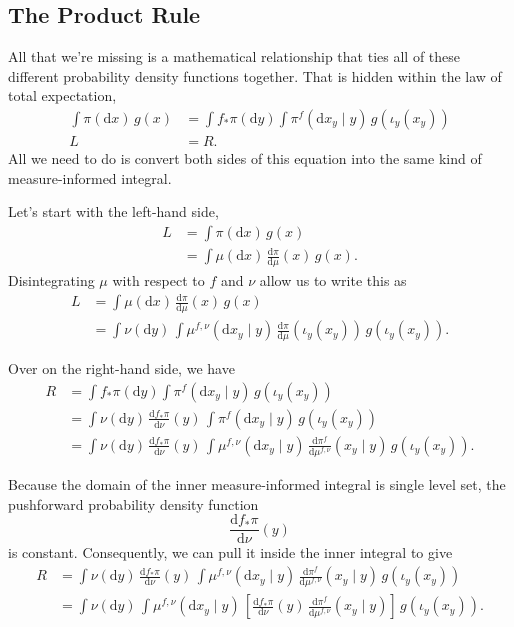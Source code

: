 \documentclass[
  letterpaper,
  DIV=11,
  numbers=noendperiod]{scrartcl}
\begin{document}
\subsection{The Product Rule}\label{the-product-rule}

All that we're missing is a mathematical relationship that ties all of
these different probability density functions together. That is hidden
within the law of total expectation, \begin{align*}
\int \pi( \mathrm{d} x ) \, g(x)
&=
\int f_{*} \pi (\mathrm{d} y)
\int \pi^{f}( \mathrm{d}x_y \mid y ) \, g( \iota_{y}(x_{y}) )
\\
L
&=
R.
\end{align*} All we need to do is convert both sides of this equation
into the same kind of measure-informed integral.

Let's start with the left-hand side, \begin{align*}
L
&=
\int \pi ( \mathrm{d} x ) \, g(x)
\\
&=
\int \mu ( \mathrm{d} x ) \, \frac{ \mathrm{d} \pi}{ \mathrm{d} \mu }(x) \, g(x).
\end{align*} Disintegrating \(\mu\) with respect to \(f\) and \(\nu\)
allow us to write this as \begin{align*}
L
&=
\int \mu ( \mathrm{d} x ) \, \frac{ \mathrm{d} \pi}{ \mathrm{d} \mu }(x) \, g(x)
\\
&=
\int \nu ( \mathrm{d} y ) \,
\int \mu^{f, \nu}( \mathrm{d} x_{y} \mid y) \,
\frac{ \mathrm{d} \pi}{ \mathrm{d} \mu }( \iota_{y}(x_{y}) ) \, g( \iota_{y}(x_{y}) ).
\end{align*}

Over on the right-hand side, we have \begin{align*}
R
&=
\int f_{*} \pi (\mathrm{d} y)
\int \pi^{f}( \mathrm{d}x_{y} \mid y ) \,
g( \iota_{y}(x_{y}) )
\\
&=
\int \nu (\mathrm{d} y) \,
\frac{ \mathrm{d}  f_{*} \pi }{ \mathrm{d}  \nu  }(y) \,
\int \pi^{f}( \mathrm{d}x_{y} \mid y ) \,
g( \iota_{y}(x_{y}) )
\\
&=
\int \nu (\mathrm{d} y) \,
\frac{ \mathrm{d}  f_{*} \pi }{ \mathrm{d}  \nu  }(y) \,
\int \mu^{f, \nu} ( \mathrm{d}x_{y} \mid y ) \,
\frac{ \mathrm{d}  \pi^{f} }{ \mathrm{d}  \mu^{f, \nu}  }(x_{y} \mid y) \,
g( \iota_{y}(x_{y}) ).
\end{align*}

Because the domain of the inner measure-informed integral is single
level set, the pushforward probability density function \[
\frac{ \mathrm{d}  f_{*} \pi }{ \mathrm{d}  \nu  }(y)
\] is constant. Consequently, we can pull it inside the inner integral
to give \begin{align*}
R
&=
\int \nu (\mathrm{d} y) \,
\frac{ \mathrm{d}  f_{*} \pi }{ \mathrm{d}  \nu  }(y) \,
\int \mu^{f, \nu} ( \mathrm{d}x_{y} \mid y ) \,
\frac{ \mathrm{d}  \pi^{f} }{ \mathrm{d}  \mu^{f, \nu}  }(x_{y} \mid y) \,
g( \iota_{y}(x_{y}) )
\\
&=
\int \nu (\mathrm{d} y) \,
\int \mu^{f, \nu} ( \mathrm{d}x_{y} \mid y ) \,
\left[
  \frac{ \mathrm{d}  f_{*} \pi }{ \mathrm{d}  \nu  }(y) \,
  \frac{ \mathrm{d}  \pi^{f} }{ \mathrm{d}  \mu^{f, \nu}  }(x_{y} \mid y)
\right] \,
g( \iota_{y}(x_{y}) ).
\end{align*}
\end{document}
